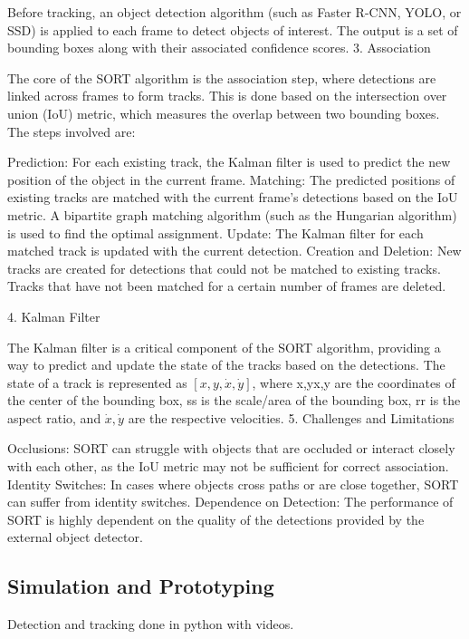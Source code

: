 Before tracking, an object detection algorithm (such as Faster R-CNN, YOLO, or SSD) is applied to each frame to detect objects of interest. The output is a set of bounding boxes along with their associated confidence scores.
3. Association

The core of the SORT algorithm is the association step, where detections are linked across frames to form tracks. This is done based on the intersection over union (IoU) metric, which measures the overlap between two bounding boxes. The steps involved are:

Prediction: For each existing track, the Kalman filter is used to predict the new position of the object in the current frame.
Matching: The predicted positions of existing tracks are matched with the current frame's detections based on the IoU metric. A bipartite graph matching algorithm (such as the Hungarian algorithm) is used to find the optimal assignment.
Update: The Kalman filter for each matched track is updated with the current detection.
Creation and Deletion: New tracks are created for detections that could not be matched to existing tracks. Tracks that have not been matched for a certain number of frames are deleted.

4. Kalman Filter

The Kalman filter is a critical component of the SORT algorithm, providing a way to predict and update the state of the tracks based on the detections. The state of a track is represented as $[x,y,\dot{x},\dot{y}]$, where x,yx,y are the coordinates of the center of the bounding box, ss is the scale/area of the bounding box, rr is the aspect ratio, and $\dot{x},\dot{y}$ are the respective velocities.
5. Challenges and Limitations

Occlusions: SORT can struggle with objects that are occluded or interact closely with each other, as the IoU metric may not be sufficient for correct association.
Identity Switches: In cases where objects cross paths or are close together, SORT can suffer from identity switches.
Dependence on Detection: The performance of SORT is highly dependent on the quality of the detections provided by the external object detector.




\subsection{Simulation and Prototyping}
Detection and tracking done in python with videos.




